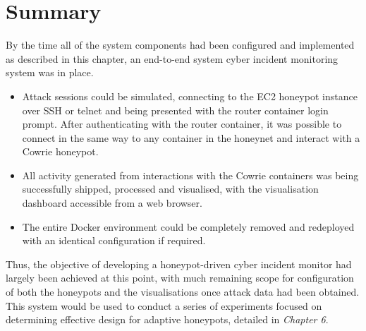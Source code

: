 \section{Summary \label{ImplementationSummary}}
By the time all of the system components had been configured and implemented as described in this chapter, an end-to-end system cyber incident monitoring system was in place.

\begin{itemize}
\item Attack sessions could be simulated, connecting to the EC2 honeypot instance over SSH or telnet and being presented with the router container login prompt. After authenticating with the router container, it was possible to connect in the same way to any container in the honeynet and interact with a Cowrie honeypot.
\item All activity generated from interactions with the Cowrie containers was being successfully shipped, processed and visualised, with the visualisation dashboard accessible from a web browser.
\item The entire Docker environment could be completely removed and redeployed with an identical configuration if required.
\end{itemize} 

Thus, the objective of developing a honeypot-driven cyber incident monitor had largely been achieved at this point, with much remaining scope for configuration of both the honeypots and the visualisations once attack data had been obtained. This system would be used to conduct a series of experiments focused on determining effective design for adaptive honeypots, detailed in \textit{Chapter 6}.